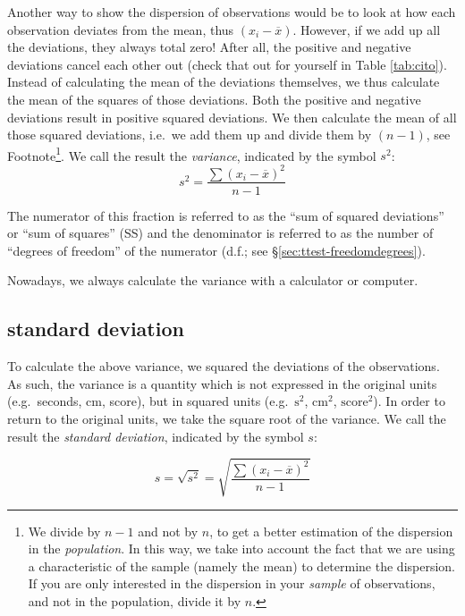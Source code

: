 \documentclass[
]{book}
\begin{document}
Another way to show the dispersion of observations would be to look at how
each observation deviates from the mean, thus \((x_i-\overline{x})\). However, if we
add up all the deviations, they always total zero! After all, the positive and negative
deviations cancel each other out (check that out for yourself in
Table \ref{tab:cito}).
Instead of calculating the mean of the deviations themselves, we thus calculate the mean
of the squares of those deviations. Both the positive and negative deviations
result in positive squared deviations. We then calculate the mean of all
those squared deviations, i.e.~we add them up and divide them by
\((n-1)\), see Footnote\footnote{We divide by \(n-1\) and not by \(n\), to get a better estimation of the dispersion in the
  \emph{population}. In this way, we take into account the fact that we are using a characteristic of the
  sample (namely the mean) to determine the dispersion. If you are only interested in the
  dispersion in your \emph{sample} of observations, and not in the population, divide it by \(n\).}. We call the result the
\emph{variance}, indicated by the symbol \(s^2\):
\begin{equation}
  s^2 = \frac{ \sum (x_i - \overline{x})^2 } {n-1}
  \label{eq:variance}
\end{equation}

The numerator of
this fraction is referred to as the ``sum of squared deviations'' or
``sum of squares'' (SS) and the denominator is referred to as the number of
``degrees of freedom'' of the numerator (d.f.; see
§\ref{sec:ttest-freedomdegrees}).

Nowadays, we always calculate the variance with a calculator
or computer.

\hypertarget{sec:standarddeviation}{%
\subsection{standard deviation}\label{sec:standarddeviation}}

To calculate the above variance, we squared the deviations of the
observations. As such, the variance is a quantity which is not expressed
in the original units (e.g.~seconds, cm, score),
but in squared units (e.g.~\(\textrm{s}^2\),
\(\textrm{cm}^2\), \(\textrm{score}^2\)). In order to return to the
original units, we take the square root of the variance. We call the result the
\emph{standard deviation}, indicated by the symbol \(s\):

\begin{equation}
  s = \sqrt{s^2} = \sqrt{ \frac{ \sum (x_i - \overline{x})^2 } {n-1} }
  \label{eq:standarddeviation}
\end{equation}
\end{document}

